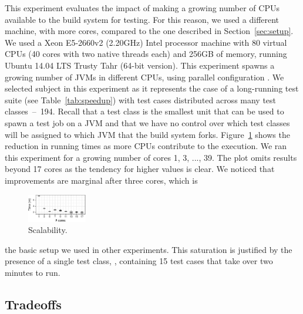 This experiment evaluates the impact of making a growing number of
CPUs available to the build system for testing.  For this reason, we
used a different machine, with more cores, compared to the one described in
Section~\ref{sec:setup}.  We used a Xeon E5-2660v2 (2.20GHz) Intel
processor machine with 80 virtual CPUs (40 cores with two native
threads each) and 256GB of memory, running Ubuntu 14.04 LTS Trusty
Tahr (64-bit version). This experiment
spawns a growing number of JVMs in different CPUs, using parallel
configuration \emph{\ForkSeq{}}. We selected
subject \subjectScalability{} in this experiment as it represents the
case of a long-running test suite (see Table~\ref{tab:speedup}) with
test cases distributed across many test classes~--~194.  
Recall that a test class is the smallest unit that can be used to spawn a test job
on a JVM and that we have no control over which test classes will be
assigned to which JVM that the build system forks.
Figure~\ref{fig:scalability} shows the reduction in running times as
more CPUs contribute to the execution.
We ran this experiment for a growing number of cores 1, 3, ..., 39. 
The plot omits results beyond 17 cores as the tendency for higher
values is clear.
We noticed that improvements are marginal after three cores, which is
\begin{figure}
  \includegraphics[width=0.23\textwidth]{R/scalability/scalability.pdf}
  \caption{\label{fig:scalability}Scalability.}
\end{figure}
the basic setup we used in other experiments.
This saturation is justified by the presence of a single test class,
, containing 15 test cases that take over
two minutes to run.

\begin{center}
\end{center}

\subsection{Tradeoffs}
\label{sec:rq6-tradeoffs}

